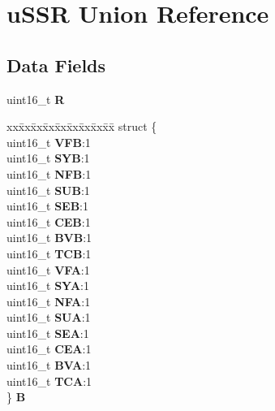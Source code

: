 \hypertarget{unionuSSR}{}\section{u\+S\+SR Union Reference}
\label{unionuSSR}
\subsection*{Data Fields}
\begin{DoxyCompactItemize}
\item 
\mbox{\label{unionuSSR_abd8fe09b076078e9dbac14a2624f2124}} 
uint16\+\_\+t {\bfseries R}
\item 
\mbox{\label{unionuSSR_ac3e0ac7fec0a03857d41d8644a721a4f}} 
\begin{tabbing}
xx\=xx\=xx\=xx\=xx\=xx\=xx\=xx\=xx\=\kill
struct \{\\
\>uint16\_t {\bfseries VFB}:1\\
\>uint16\_t {\bfseries SYB}:1\\
\>uint16\_t {\bfseries NFB}:1\\
\>uint16\_t {\bfseries SUB}:1\\
\>uint16\_t {\bfseries SEB}:1\\
\>uint16\_t {\bfseries CEB}:1\\
\>uint16\_t {\bfseries BVB}:1\\
\>uint16\_t {\bfseries TCB}:1\\
\>uint16\_t {\bfseries VFA}:1\\
\>uint16\_t {\bfseries SYA}:1\\
\>uint16\_t {\bfseries NFA}:1\\
\>uint16\_t {\bfseries SUA}:1\\
\>uint16\_t {\bfseries SEA}:1\\
\>uint16\_t {\bfseries CEA}:1\\
\>uint16\_t {\bfseries BVA}:1\\
\>uint16\_t {\bfseries TCA}:1\\
\} {\bfseries B}\\


\end{tabbing}
\end{DoxyCompactItemize}
